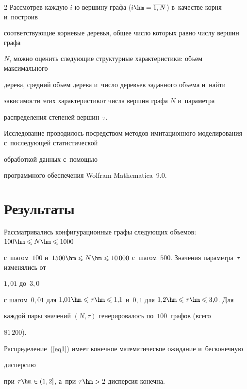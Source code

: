 \begin{multicols}{2}
Рас\-смот\-рев каждую $i$-ю вершину графа ($i\hm=\overline{1,N}$) в~качестве корня и~построив 


соответствующие корневые деревья, общее число которых равно числу вершин графа 


$N$, можно оценить следующие структурные характеристики: объем максимального 


дерева, средний объем дерева и~число деревьев заданного объема и~найти 


зависимости этих характеристик\linebreak от числа вершин графа $N$ и~параметра 


распределения степеней вершин~$\tau$.


Исследование проводилось посредством методов имитационного моделирования с~последующей статистической 


\mbox{обработкой} данных с~пом\-ощью 


программного обеспечения Wolfram  Mathematica~9.0.





\vspace*{-6pt}





\section{Результаты}





Рассматривались конфигурационные графы следующих объемов: $100\hm\leqslant N\hm\leqslant 1000$ 


с~шагом~$100$ и~$1500\hm\leqslant N\hm\leqslant 10\,000$ с~шагом~$500$. Значения параметра~$\tau$ изменялись от 


$1{,}01$ до~$3{,}0$


с шагом~$0{,}01$ для $1{,}01\hm\leqslant\tau\hm\leqslant 1{,}1$ и~$0{,}1$ для $1{,}2\hm\leqslant\tau\hm\leqslant 3{,}0$. Для 


каждой пары значений $(N,\tau)$ генерировалось по~$100$~графов (всего 


$81\,200$).





Распределение~(\ref{eq1}) имеет конечное математическое ожидание и~бесконечную 


дисперсию


при $\tau\hm\in(1,2]$, а~при $\tau\hm>2$ дисперсия конечна.



\end{multicols}
